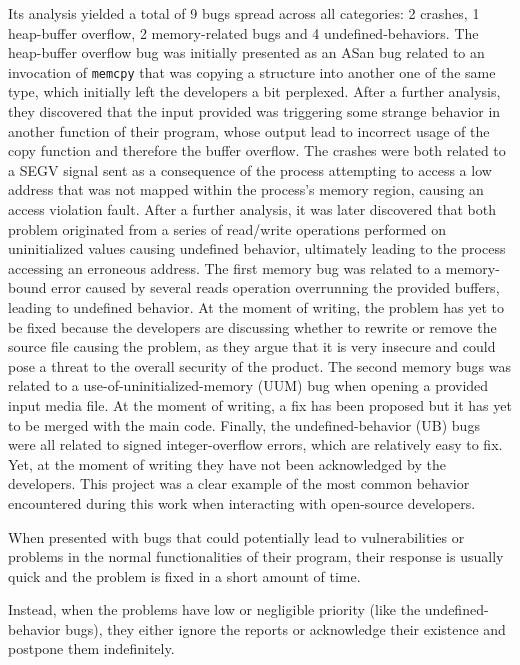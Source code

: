 Its analysis yielded a total of 9 bugs spread across all categories: 2 crashes, 1 heap-buffer overflow, 2 memory-related bugs and 4 undefined-behaviors.
The heap-buffer overflow bug was initially presented as an ASan bug related to an invocation of \verb|memcpy| that was copying a structure into another one of the same type, which initially left the developers a bit perplexed. After a further analysis, they discovered that the input provided was triggering some strange behavior in another function of their program, whose output lead to incorrect usage of the copy function and therefore the buffer overflow.
The crashes were both related to a SEGV signal sent as a consequence of the process attempting to access a low address that was not mapped within the process's memory region, causing an access violation fault. After a further analysis, it was later discovered that both problem originated from a series of read/write operations performed on uninitialized values causing undefined behavior, ultimately leading to the process accessing an erroneous address.
The first memory bug was related to a memory-bound error caused by several reads operation overrunning the provided buffers, leading to undefined behavior. At the moment of writing, the problem has yet to be fixed because the developers are discussing whether to rewrite or remove the source file causing the problem, as they argue that it is very insecure and could pose a threat to the overall security of the product.
The second memory bugs was related to a use-of-uninitialized-memory (UUM) bug when opening a provided input media file. At the moment of writing, a fix has been proposed but it has yet to be merged with the main code.
Finally, the undefined-behavior (UB) bugs were all related to signed integer-overflow errors, which are relatively easy to fix.
Yet, at the moment of writing they have not been acknowledged by the developers.
This project was a clear example of the most common behavior encountered during this work when interacting with open-source developers.

When presented with bugs that could potentially lead to vulnerabilities or problems in the normal functionalities of their program, their response is usually quick and the problem is fixed in a short amount of time. 

Instead, when the problems have low or negligible priority (like the undefined-behavior bugs), they either ignore the reports or acknowledge their existence and postpone them indefinitely. 

\ \\ 
 

